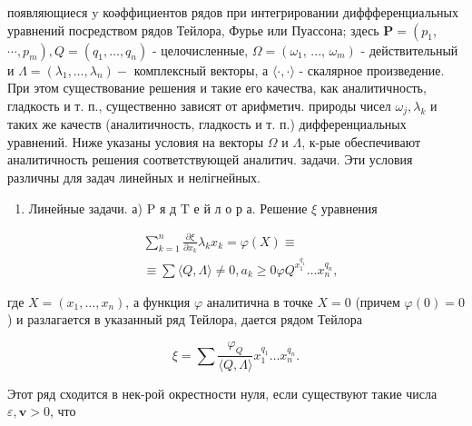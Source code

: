 \documentclass[10pt]{article}
\begin{document}
появляющиеся $\mathrm{y}$ коәффициентов рядов при интегрировании диффференциальных уравнений посредством рядов Тейлора, Фурье или Пуассона; здесь $\boldsymbol{P}=\left(p_{1}\right.$, $\left.\cdots, p_{m}\right), Q=\left(q_{1}, \ldots, q_{n}\right)$ - целочисленные, $\Omega=\left(\omega_{1}\right.$, ..., $\left.\omega_{m}\right)$ - действительный и $\Lambda=\left(\lambda_{1}, \ldots, \lambda_{n}\right)-$ комплексный векторы, а $\langle\cdot, \cdot\rangle$ - скалярное произведение. При этом существование решения и такие его качества, как аналитичность, гладкость и т. п., существенно зависят от арифметич. природы чисел $\omega_{j}, \lambda_{k}$ и таких же качеств (аналитичность, гладкость и т. п.) дифференциальных уравнений. Ниже указаны условия на векторы $\Omega$ и $\Lambda$, к-рые обеспечивают аналитичность решения соответствующей аналитич. задачи. Эти условия различны для задач линейных и нелігнейных.



\begin{enumerate}

  \item Линейные задачи. а) $\mathrm{P}$ я д $\mathrm{T}$ е й л о р а. Решение $\xi$ уравнения

\end{enumerate}



\[

\begin{aligned}

& \sum_{k=1}^{n} \frac{\partial \xi}{\partial x_{k}} \lambda_{k} x_{k}=\varphi(X) \equiv \\

& \equiv \sum\langle Q, \Lambda\rangle \neq 0, a_{k} \geqslant 0 \varphi Q^{x_{1}^{q_{1}}} \ldots x_{n}^{q_{n}},

\end{aligned}

\]



где $X=\left(x_{1}, \ldots, x_{n}\right)$, а функция $\varphi$ аналитична в точке $X=0$ (причем $\varphi(0)=0$ ) и разлагается в указанный ряд Тейлора, дается рядом Тейлора



\[

\xi=\sum \frac{\varphi_{Q}}{\langle Q, \Lambda\rangle} x_{1}^{q_{1}} \ldots x_{n}^{q_{n}} .

\]



Этот ряд сходится в нек-рой окрестности нуля, если существуют такие числа $\varepsilon, \boldsymbol{v}>0$, что
\end{document}
